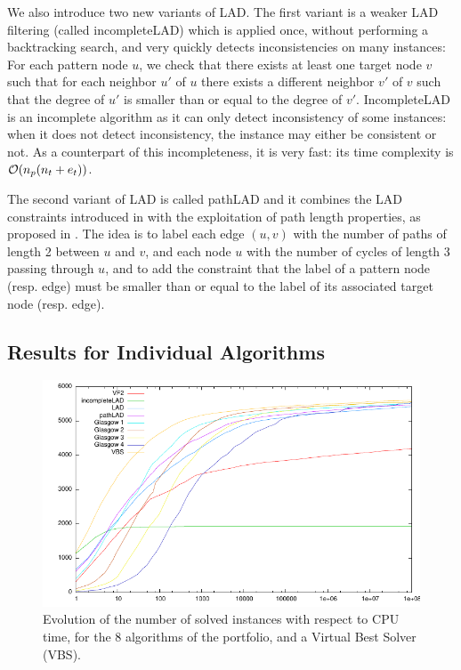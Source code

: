 \documentclass{llncs}
\begin{document}
We also introduce two new variants of LAD. The first variant is a weaker LAD filtering (called incompleteLAD) which is applied once, without performing a backtracking search, and very quickly detects inconsistencies on many instances: For each pattern node $u$, we check that there exists at least one target node $v$ such that for each neighbor $u'$ of $u$ there exists a different neighbor $v'$ of $v$ such that the degree of $u'$ is smaller than or equal to the degree of $v'$. IncompleteLAD is an incomplete algorithm as it can only detect inconsistency of some instances: when it does not detect inconsistency, the instance may either be consistent or not. As a counterpart of this incompleteness, it is very fast: its time complexity is ${\cal O}(n_p(n_t+e_t))$.

The second variant of LAD is called pathLAD and it combines the LAD constraints introduced in \cite{Solnon:2010} with the exploitation of path length properties, as proposed in \cite{Audemard:2014}. The idea is to label each edge $(u,v)$ with the number of paths of length 2 between $u$ and $v$, and each node $u$ with the number of cycles of length 3 passing through $u$, and to add the constraint that the label of a pattern node (resp. edge) must be smaller than or equal to the label of its associated target node (resp. edge). 

\subsection{Results for Individual Algorithms} \label{expComp}

\begin{figure}[t]
\includegraphics[width=\textwidth]{courbe.pdf}
\caption{Evolution of the number of solved instances with respect to CPU time, for the 8 algorithms of the portfolio, and a Virtual Best Solver (VBS).\label{expTimeGraph}}
\end{figure}
\end{document}
